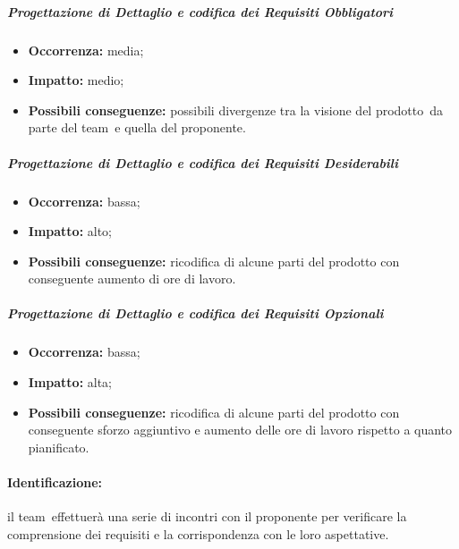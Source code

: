\documentclass[../PianoProgetto.tex]{subfiles}
\begin{document}
		\subparagraph*{Progettazione di Dettaglio e codifica dei Requisiti Obbligatori}
			\begin{itemize}[label={-}]
				\item \textbf{Occorrenza:} media;
				\item \textbf{Impatto:} medio;
				\item \textbf{Possibili conseguenze:} possibili divergenze tra la visione del prodotto\g\ da parte del team\g\ e quella del proponente.
			\end{itemize}
			
		\subparagraph*{Progettazione di Dettaglio e codifica dei Requisiti Desiderabili}
			\begin{itemize}[label={-}]
				\item \textbf{Occorrenza:} bassa;
				\item \textbf{Impatto:} alto;
				\item \textbf{Possibili conseguenze:} ricodifica di alcune parti del prodotto con conseguente aumento di ore di lavoro.
			\end{itemize}
			
		\subparagraph*{Progettazione di Dettaglio e codifica dei Requisiti Opzionali}
			\begin{itemize}[label={-}]
				\item \textbf{Occorrenza:} bassa;
				\item \textbf{Impatto:} alta;
				\item \textbf{Possibili conseguenze:} ricodifica di alcune parti del prodotto con conseguente sforzo aggiuntivo e aumento delle ore di lavoro rispetto a quanto pianificato.
			\end{itemize}
			
		
	\paragraph*{Identificazione:} il team\g\ effettuerà una serie di incontri con il proponente per verificare la comprensione dei requisiti e la corrispondenza con le loro aspettative.
	
\end{document}
